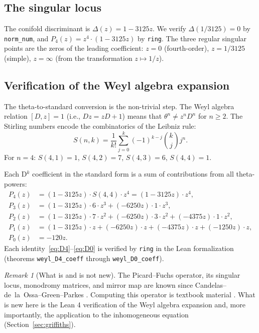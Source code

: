 \documentclass[11pt]{article}
\theoremstyle{plain}
\theoremstyle{definition}
\theoremstyle{remark}
\newtheorem{remark}[theorem]{Remark}
\begin{document}
\subsection{The singular locus}

The conifold discriminant is $\Delta(z) = 1 - 3125z$. We verify $\Delta(1/3125) = 0$ by \texttt{norm\_num}, and $P_4(z) = z^4 \cdot (1 - 3125z)$ by \texttt{ring}. The three regular singular points are the zeros of the leading coefficient: $z = 0$ (fourth-order), $z = 1/3125$ (simple), $z = \infty$ (from the transformation $z \mapsto 1/z$).

\subsection{Verification of the Weyl algebra expansion}

The theta-to-standard conversion is the non-trivial step. The Weyl algebra relation $[D, z] = 1$ (i.e., $Dz = zD + 1$) means that $\theta^n \neq z^n D^n$ for $n \geq 2$. The Stirling numbers encode the combinatorics of the Leibniz rule:
\begin{equation}\label{eq:stirling}
S(n,k) = \frac{1}{k!}\sum_{j=0}^{k} (-1)^{k-j}\binom{k}{j} j^n.
\end{equation}
For $n = 4$: $S(4,1) = 1$, $S(4,2) = 7$, $S(4,3) = 6$, $S(4,4) = 1$.

Each D$^k$ coefficient in the standard form is a sum of contributions from all theta-powers:
\begin{align}
P_4(z) &= (1-3125z) \cdot S(4,4) \cdot z^4 = (1-3125z) \cdot z^4, \label{eq:D4}\\
P_3(z) &= (1-3125z) \cdot 6 \cdot z^3 + (-6250z) \cdot 1 \cdot z^3, \label{eq:D3}\\
P_2(z) &= (1-3125z) \cdot 7 \cdot z^2 + (-6250z) \cdot 3 \cdot z^2 + (-4375z) \cdot 1 \cdot z^2, \label{eq:D2}\\
P_1(z) &= (1-3125z) \cdot z + (-6250z) \cdot z + (-4375z) \cdot z + (-1250z) \cdot z, \label{eq:D1}\\
P_0(z) &= -120z. \label{eq:D0}
\end{align}
Each identity~\eqref{eq:D4}--\eqref{eq:D0} is verified by \texttt{ring} in the Lean formalization (theorems \texttt{weyl\_D4\_coeff} through \texttt{weyl\_D0\_coeff}).

\begin{remark}[What is and is not new]
The Picard--Fuchs operator, its singular locus, monodromy matrices, and mirror map are known since Candelas--de~la~Ossa--Green--Parkes \cite{candelas-ossa-green-parkes}. Computing this operator is textbook material \cite{cox-katz,morrison}. What is new here is the Lean 4 verification of the Weyl algebra expansion and, more importantly, the application to the inhomogeneous equation (Section~\ref{sec:griffiths}).
\end{remark}
\end{document}
